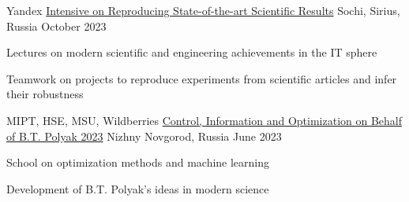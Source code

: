 \begin{cventries}
\cventry
    {Yandex} %
    {\href{https://education.yandex.ru/sirius/sota}{Intensive on Reproducing State-of-the-art Scientific Results}} %
    {Sochi, Sirius, Russia} %
    {October 2023} %
    {
      \begin{cvitems} %
        \item {Lectures on modern scientific and engineering achievements in the IT sphere}
        \item {Teamwork on projects to reproduce experiments from scientific articles and infer their robustness}
      \end{cvitems}
    }

\cventry
    {MIPT, HSE, MSU, Wildberries} %
    {\href{http://ssopt.org}{Control, Information and Optimization on Behalf of B.T. Polyak 2023}} %
    {Nizhny Novgorod, Russia} %
    {June 2023} %
    {
      \begin{cvitems} %
        \item {School on optimization methods and machine learning} 
        \item {Development of B.T. Polyak's ideas in modern science}
      \end{cvitems}
    }


\end{cventries}